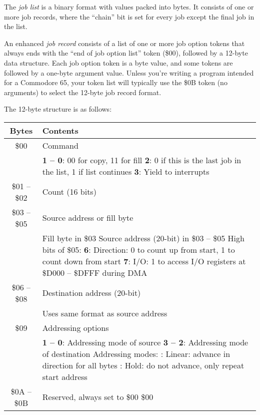 The {\em job list} is a binary format with values packed into bytes. It consists of one or more job records, where the ``chain'' bit is set for every job except the final job in the list.

An enhanced {\em job record} consists of a list of one or more job option tokens that always ends with the ``end of job option list'' token (\$00), followed by a 12-byte data structure. Each job option token is a byte value, and some tokens are followed by a one-byte argument value. Unless you're writing a program intended for a Commodore 65, your token list will typically use the \$0B token (no arguments) to select the 12-byte job record format.

The 12-byte structure is as follows:

\begin{center}
\begin{tabular}{|c|p{6cm}|}
\hline
{\bf Bytes} & {\bf Contents} \\
\hline

\$00 & Command \\
& {\bf 1 -- 0}: 00 for copy, 11 for fill \newline
{\bf 2}: 0 if this is the last job in the list, 1 if list continues \newline
{\bf 3}: Yield to interrupts \\
\hline

\$01 -- \$02 & Count (16 bits) \\
\hline

\$03 -- \$05 & Source address or fill byte \\
& Fill byte in \$03 \newline
Source address (20-bit) in \$03 -- \$05 \newline
High bits of \$05: \newline
{\bf 6}: Direction: 0 to count up from start, 1 to count down from start \newline
{\bf 7}: I/O: 1 to access I/O registers at \$D000 -- \$DFFF during DMA \\
\hline

\$06 -- \$08 & Destination address (20-bit) \\
& Uses same format as source address \\
\hline

\$09 & Addressing options \\
& {\bf 1 -- 0}: Addressing mode of source \newline
{\bf 3 -- 2}: Addressing mode of destination \newline
Addressing modes: \newline
00: Linear: advance in direction for all bytes \newline
10: Hold: do not advance, only repeat start address \\
\hline

\$0A -- \$0B & Reserved, always set to \$00 \$00 \\
\hline

\end{tabular}
\end{center}

